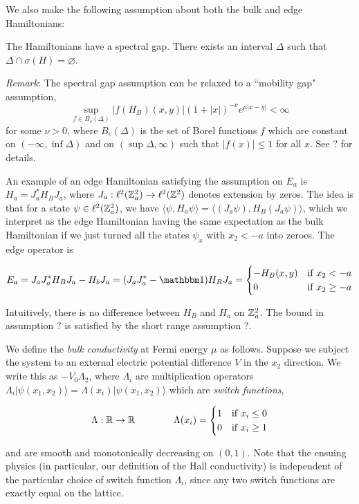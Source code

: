 \documentclass[12pt, letterpaper]{article}
\begin{document}
We also make the following assumption about both the bulk and edge Hamiltonians:

\begin{assumption}
The Hamiltonians have a spectral gap. There exists an interval $\Delta$ such that $\Delta \cap \sigma(H) = \varnothing$.
\end{assumption}

\textit{Remark}: The spectral gap assumption can be relaxed to a ``mobility gap" assumption,
\[\sup_{f \in B_c(\Delta)}|f(H_B)(x,y)|(1+|x|)^{-\nu}e^{\mu|x-y|} < \infty\]
for some $\nu>0$, where $B_c(\Delta)$ is the set of Borel functions $f$ which are constant on $(-\infty,\inf \Delta)$ and on $(\sup \Delta, \infty)$ such that $|f(x)| \leq 1$ for all $x$. See ? for details.

An example of an edge Hamiltonian satisfying the assumption on $E_a$ is $H_a = J_a^*H_BJ_a$, where $J_a:\ell^2(\mathbb{Z}^2_a)\to\ell^2(\mathbb{Z}^2)$ denotes extension by zeros. The idea is that for a state $\psi \in \ell^2(\mathbb{Z}^2_a)$, we have $\langle \psi, H_a \psi \rangle = \langle (J_a \psi), H_B (J_a\psi) \rangle$, which we interpret as the edge Hamiltonian having the same expectation as the bulk Hamiltonian if we just turned all the states $\psi_x$ with $x_2<-a$ into zeroes.  The edge operator is 

\[E_a = J_aJ_a^*H_BJ_a - H_bJ_a = (J_aJ_a^*-\One)H_BJ_a = \begin{cases} -H_B(x,y) & \text{if } x_2 < -a \\ 0 & \text{if } x_2\geq -a\end{cases}\]

Intuitively, there is no difference between $H_B$ and $H_a$ on $\mathbb{Z}^2_a$. The bound in assumption ? is satisfied by the short range assumption ?.

We define the \textit{bulk conductivity} at Fermi energy $\mu$ as follows. Suppose we subject the system to an external electric potential difference $V$ in the $x_2$ direction. We write this as $-V_0 \Lambda_2$, where $\Lambda_i$ are multiplication operators $\Lambda_i |\psi(x_1,x_2)\rangle = \Lambda(x_i)|\psi(x_1,x_2)\rangle$ which are \textit{switch functions},

\[\Lambda : \mathbb{R}\to\mathbb{R} \quad\quad\quad\quad \Lambda(x_i) = \begin{cases} 1 & \text{if } x_i \leq 0 \\ 0 & \text{if } x_i \geq1\end{cases}\]

and are smooth and monotonically decreasing on $(0,1)$. Note that the ensuing physics (in particular, our definition of the Hall conductivity) is independent of the particular choice of switch function $\Lambda_i$, since any two switch functions are exactly equal on the lattice. 
\end{document}
